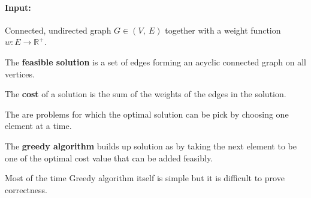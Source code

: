 \paragraph{Input:} Connected, undirected graph $G \in (V,~E)$ together with a 
weight function $w: E \rightarrow \mathbb{R}^+$.

\begin{definition}
 The \textbf{feasible solution} is a set of edges forming an acyclic connected 
graph on all vertices.
\end{definition}

\begin{definition}
 The \textbf{cost} of a solution is the sum of the weights of the edges in the 
solution.
\end{definition}

The are problems for which the optimal solution can be pick by choosing one 
element at a time.

\begin{definition}
The \textbf{greedy algorithm} builds up solution as by taking the next element 
to be one of the optimal cost value that can be added feasibly.
\end{definition}

Most of the time Greedy algorithm itself is simple but it is difficult to prove 
correctness.

